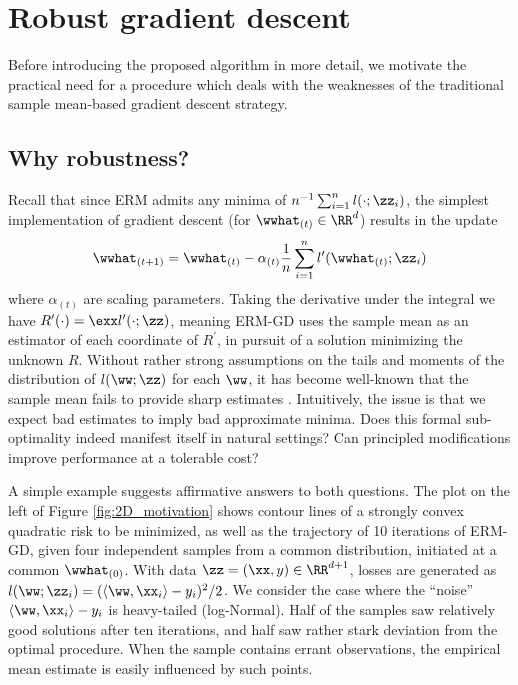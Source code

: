 \documentclass[11pt,oneside]{article}
\theoremstyle{definition} \newtheorem{defn}{Definition}       %
\theoremstyle{plain} \newtheorem{prop}[defn]{Proposition}           %
\theoremstyle{plain} \newtheorem{thm}[defn]{Theorem}                %
\theoremstyle{plain} \newtheorem{lem}[defn]{Lemma}                  %
\theoremstyle{plain} \newtheorem{cor}[defn]{Corollary}              %
\theoremstyle{remark} \newtheorem{rmk}[defn]{Remark}                %
\theoremstyle{remark} \newtheorem{ex}[defn]{Example}                %
\begin{document}
\section{Robust gradient descent}\label{sec:intuitive}

Before introducing the proposed algorithm in more detail, we motivate the practical need for a procedure which deals with the weaknesses of the traditional sample mean-based gradient descent strategy.


\subsection{Why robustness?}\label{sec:intuitive_2D}

Recall that since ERM admits any minima of $n^{-1}\sum_{i=1}^{n}l(\cdot;\zz_{i})$, the simplest implementation of gradient descent (for $\wwhat_{(t)} \in \RR^{d}$) results in the update
%
\begin{align}\label{eqn:ERM-GD}
\wwhat_{(t+1)} = \wwhat_{(t)} - \alpha_{(t)} \frac{1}{n}\sum_{i=1}^{n}l^{\prime}(\wwhat_{(t)};\zz_{i})
\end{align}
%
where $\alpha_{(t)}$ are scaling parameters. Taking the derivative under the integral we have $R^{\prime}(\cdot) = \exx l^{\prime}(\cdot;\zz)$, meaning ERM-GD uses the sample mean as an estimator of each coordinate of $R^{\prime}$, in pursuit of a solution minimizing the unknown $R$. Without rather strong assumptions on the tails and moments of the distribution of $l(\ww;\zz)$ for each $\ww$, it has become well-known that the sample mean fails to provide sharp estimates \citep{catoni2012a,minsker2015a,devroye2015a,lugosi2016a}. Intuitively, the issue is that we expect bad estimates to imply bad approximate minima. Does this formal sub-optimality indeed manifest itself in natural settings? Can principled modifications improve performance at a tolerable cost?

A simple example suggests affirmative answers to both questions. The plot on the left of Figure \ref{fig:2D_motivation} shows contour lines of a strongly convex quadratic risk to be minimized, as well as the trajectory of 10 iterations of ERM-GD, given four independent samples from a common distribution, initiated at a common $\wwhat_{(0)}$. With data $\zz = (\xx,y) \in \RR^{d+1}$, losses are generated as $l(\ww;\zz_{i})=(\langle \ww, \xx_{i} \rangle - y_{i})^{2}/2$. We consider the case where the ``noise'' $\langle \ww, \xx_{i} \rangle - y_{i}$ is heavy-tailed (log-Normal). Half of the samples saw relatively good solutions after ten iterations, and half saw rather stark deviation from the optimal procedure. When the sample contains errant observations, the empirical mean estimate is easily influenced by such points.
\end{document}
